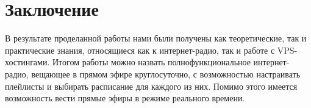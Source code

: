 \chapter{Заключение}

В результате проделанной работы нами были получены как теоретические, так и практические знания, относящиеся как к интернет-радио, так и работе с VPS-хостингами. Итогом работы можно назвать полнофункциональное интернет-радио, вещающее в прямом эфире круглосуточно, с возможностью настраивать плейлисты и выбирать расписание для каждого из них. Помимо этого имеется возможность вести прямые эфиры в режиме реального времени.